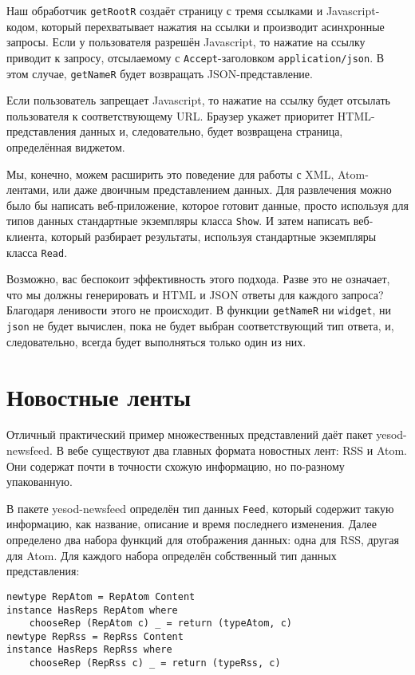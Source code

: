 
Наш обработчик \lstinline'getRootR' создаёт страницу с тремя ссылками и Javascript-кодом,
который перехватывает нажатия на ссылки и производит асинхронные запросы. Если у
пользователя разрешён Javascript, то нажатие на ссылку приводит к запросу, отсылаемому с
\verb*|Accept|-заголовком \verb*|application/json|. В этом случае, \lstinline'getNameR'
будет возвращать JSON-представление.

Если пользователь запрещает Javascript, то нажатие на ссылку будет отсылать пользователя к соответствующему URL. Браузер укажет приоритет HTML-представления данных и, следовательно, будет возвращена страница, определённая виджетом.

Мы, конечно, можем расширить это поведение для работы с XML, Atom-лентами, или даже
двоичным представлением данных. Для развлечения можно было бы написать веб-приложение,
которое готовит данные, просто используя для типов данных стандартные экземпляры класса
\lstinline'Show'. И затем написать веб-клиента, который разбирает результаты, используя
стандартные экземпляры класса \lstinline'Read'.

\begin{remark}
Возможно, вас беспокоит эффективность этого подхода. Разве это не означает, что мы должны
генерировать и HTML и JSON ответы для каждого запроса? Благодаря ленивости этого не
происходит. В функции \lstinline'getNameR' ни \lstinline'widget', ни \lstinline'json' не
будет вычислен, пока не будет выбран соответствующий тип ответа, и, следовательно, всегда
будет выполняться только один из них.
\end{remark}

\section{Новостные ленты}

Отличный практический пример множественных представлений даёт пакет yesod-newsfeed. В вебе существуют два главных формата новостных лент: RSS и Atom. Они содержат почти в точности схожую информацию, но по-разному упакованную.

В пакете yesod-newsfeed определён тип данных \lstinline'Feed', который содержит такую информацию, как название, описание и время последнего изменения. Далее определено два набора функций для отображения данных: одна для RSS, другая для Atom. Для каждого набора определён собственный тип данных представления:

\begin{lstlisting}
newtype RepAtom = RepAtom Content
instance HasReps RepAtom where
    chooseRep (RepAtom c) _ = return (typeAtom, c)
newtype RepRss = RepRss Content
instance HasReps RepRss where
    chooseRep (RepRss c) _ = return (typeRss, c)
\end{lstlisting}

